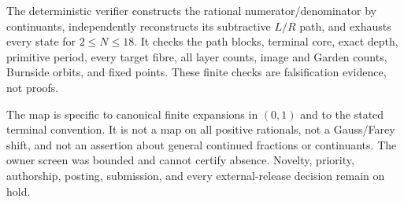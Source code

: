 \documentclass[10pt,a4paper]{amsart}
\theoremstyle{definition}
\theoremstyle{remark}
\begin{document}
The deterministic verifier constructs the rational numerator/denominator by
continuants, independently reconstructs its subtractive $L/R$ path, and
exhausts every state for $2\le N\le18$.  It checks the path blocks, terminal
core, exact depth, primitive period, every target fibre, all layer counts,
image and Garden counts, Burnside orbits, and fixed points.  These finite
checks are falsification evidence, not proofs.

The map is specific to canonical finite expansions in $(0,1)$ and to the
stated terminal convention.  It is not a map on all positive rationals, not a
Gauss/Farey shift, and not an assertion about general continued fractions or
continuants.  The owner screen was bounded and cannot certify absence.
Novelty, priority, authorship, posting, submission, and every external-release
decision remain on hold.



\end{document}
